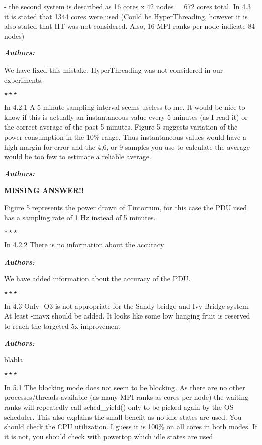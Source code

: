 \documentclass[a4paper,11pt]{article}
\newcounter{question}
\newcommand{\weReply}{\vspace{0.25cm} {\bf \noindent } \addtocounter{question}{1} \textbf{\emph{Authors:}} \medskip \em\par}
\newenvironment{weSay}{\bigskip \weReply \begin{it}}{\end{it}\begin{center} \samepage$\star \star \star$ \end{center}}
\begin{document}
- the second system is described as 16 cores x 42 nodes = 672 cores total. In
     4.3 it is stated that 1344 cores were used (Could be HyperThreading, however
     it is also stated that HT was not considered. Also, 16 MPI ranks per node
     indicate 84 nodes)

\begin{weSay}
We have fixed this mistake. HyperThreading was not considered in our experiments.
\end{weSay}

In 4.2.1
A 5 minute sampling interval seems useless to me. It would be nice to know if
this is actually an instantaneous value every 5 minutes (as I read it) or the
correct average of the past 5 minutes. Figure 5 suggests variation of the power
consumption in the 10\% range. Thus instantaneous values would have a high margin
for error and the 4,6, or 9 samples you use to calculate the average would be
too few to estimate a reliable average.

\begin{weSay}
\textbf{MISSING ANSWER!!}

Figure 5 represents the power drawn of Tintorrum, for this case the PDU used has a sampling rate of 1 Hz instead of 5 minutes.
\end{weSay}

In 4.2.2
There is no information about the accuracy

\begin{weSay}
We have added information about the accuracy of the PDU.
\end{weSay}

In 4.3
Only -O3 is not appropriate for the Sandy bridge and Ivy Bridge system. At
least -mavx should be added. It looks like some low hanging fruit is reserved
to reach the targeted 5x improvement

\begin{weSay}
blabla
\end{weSay}

In 5.1
The blocking mode does not seem to be blocking. As there are no other
processes/threads available (as many MPI ranks as cores per node) the waiting
ranks will repeatedly call sched\_yield() only to be picked again by the OS
scheduler. This also explains the small benefit as no idle states are used.
You should check the CPU utilization. I guess it is 100\% on all cores in both
modes. If it is not, you should check with powertop which idle states are used.
\end{document}
